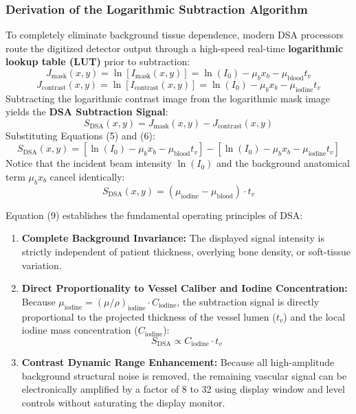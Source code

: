 \documentclass[11pt,a4paper]{article}
\begin{document}
\subsubsection{Derivation of the Logarithmic Subtraction Algorithm}
To completely eliminate background tissue dependence, modern DSA processors route the digitized detector output through a high-speed real-time \textbf{logarithmic lookup table (LUT)} prior to subtraction:
\begin{equation}
    J_{\text{mask}}(x,y) = \ln\left[ I_{\text{mask}}(x,y) \right] = \ln(I_0) - \mu_b x_b - \mu_{\text{blood}} t_v
\end{equation}
\begin{equation}
    J_{\text{contrast}}(x,y) = \ln\left[ I_{\text{contrast}}(x,y) \right] = \ln(I_0) - \mu_b x_b - \mu_{\text{iodine}} t_v
\end{equation}
Subtracting the logarithmic contrast image from the logarithmic mask image yields the \textbf{DSA Subtraction Signal}:
\begin{equation}
    S_{\text{DSA}}(x,y) = J_{\text{mask}}(x,y) - J_{\text{contrast}}(x,y)
\end{equation}
Substituting Equations (5) and (6):
\begin{equation}
    S_{\text{DSA}}(x,y) = \left[ \ln(I_0) - \mu_b x_b - \mu_{\text{blood}} t_v \right] - \left[ \ln(I_0) - \mu_b x_b - \mu_{\text{iodine}} t_v \right]
\end{equation}
Notice that the incident beam intensity $\ln(I_0)$ and the background anatomical term $\mu_b x_b$ cancel identically:
\begin{equation}
    S_{\text{DSA}}(x,y) = \left( \mu_{\text{iodine}} - \mu_{\text{blood}} \right) \cdot t_v
\end{equation}

\begin{physicsbox}
Equation (9) establishes the fundamental operating principles of DSA:
\begin{enumerate}[leftmargin=*]
    \item \textbf{Complete Background Invariance:} The displayed signal intensity is strictly independent of patient thickness, overlying bone density, or soft-tissue variation.
    \item \textbf{Direct Proportionality to Vessel Caliber and Iodine Concentration:} Because $\mu_{\text{iodine}} = (\mu/\rho)_{\text{iodine}} \cdot C_{\text{iodine}}$, the subtraction signal is directly proportional to the projected thickness of the vessel lumen ($t_v$) and the local iodine mass concentration ($C_{\text{iodine}}$):
    \begin{equation}
        S_{\text{DSA}} \propto C_{\text{iodine}} \cdot t_v
    \end{equation}
    \item \textbf{Contrast Dynamic Range Enhancement:} Because all high-amplitude background structural noise is removed, the remaining vascular signal can be electronically amplified by a factor of 8 to 32 using display window and level controls without saturating the display monitor.
\end{enumerate}
\end{physicsbox}
\end{document}
